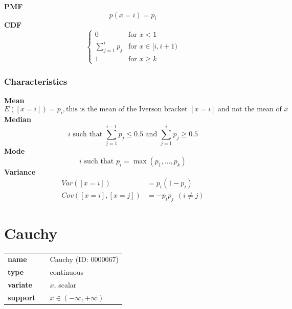 \smallskip \noindent \hspace{.2cm} \textbf{PMF} 
\begin{equation*}p(x=i)=p_i\end{equation*}
\smallskip \noindent \hspace{.2cm} \textbf{CDF} 
\begin{equation*}\begin{cases}
    0 & \text{for }x<1 \\
    \sum_{j=1}^i p_j & \text{for }x \in [i,i+1) \\
    1 & \text{for }x \geq k
    \end{cases}\end{equation*}
\smallskip
\subsubsection*{Characteristics}
\smallskip \noindent \hspace{.2cm} \textbf{Mean} 
\begin{equation*}E([x=i]) = p_i, \text{this is the mean of the Iverson bracket } [x=i] \text{ and not the mean of } x\end{equation*}
\smallskip \noindent \hspace{.2cm} \textbf{Median} 
\begin{equation*}i\text{ such that }\sum_{j=1}^{i-1} p_j \leq 0.5\text{ and }\sum_{j=1}^{i} p_j \geq 0.5\end{equation*}
\smallskip \noindent \hspace{.2cm} \textbf{Mode} 
\begin{equation*}i\text{ such that }p_i=\max(p_1, \ldots, p_k)\end{equation*}
\smallskip \noindent \hspace{.2cm} \textbf{Variance} 
\begin{align*}Var([x=i]) &= p_i (1-p_i) \\ Cov([x=i],[x=j]) &= - p_i p_j~~(i\neq j)\end{align*}
\smallskip
\section*{Cauchy} 

  \bigskip 

\begin{tabular}{p{2cm}cl}
\textbf{name} & & Cauchy (ID: 0000067)\\ 
 
\textbf{type} & & continuous \\ 

\textbf{variate} & & $x$, scalar \\ 

\textbf{support} & & $x \in (-\infty,+\infty)$
\end{tabular}

